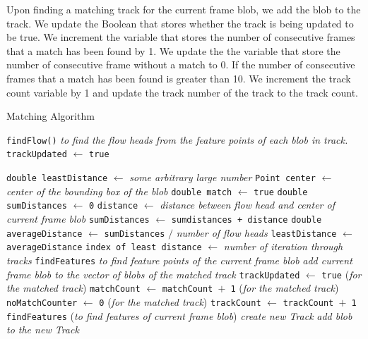 \documentclass[a4paper]{aitthesis}
\begin{document}
Upon finding a matching track for the current frame blob, we add the blob to the track. We update the Boolean that stores whether the track is being updated to be true. We increment the variable that stores the number of consecutive frames that a match has been found by 1. We update the the variable that store the number of consecutive frame without a match to 0.
If the number of consecutive frames that a match has been found is greater than 10. We increment the track count variable by 1 and update the track number of the track to the track count.
\begin{algorithm}[H]
\caption{Matching Algorithm}
\begin{algorithmic}
 
\small {}
\small \STATE \texttt{findFlow()} \textit{to find the flow heads from the feature points of each blob in track.}
\small \STATE  \texttt{trackUpdated} $\leftarrow$ \texttt{true}
\small \ENDFOR

\small {}
\small \STATE \texttt{double leastDistance} $\leftarrow$ \textit{some arbitrary large number}
\small \STATE \texttt{Point center} $\leftarrow$ \textit{center of the bounding box of the blob}
\small {}
\small \STATE \texttt{double match} $\leftarrow$ \texttt{true}
\small \STATE \texttt{double sumDistances} $\leftarrow$ \texttt{0}
\small {}
\small \STATE \texttt{distance} $\leftarrow$ \textit{distance between flow head and center of current frame blob}
\small \STATE \texttt{sumDistances} $\leftarrow$ \texttt{sumdistances + distance}
\small \ENDFOR
\small \STATE \texttt{double averageDistance} $\leftarrow$ \texttt{sumDistances} $/$ \textit{number of flow heads} 
\small {}
\small \STATE \texttt{leastDistance} $\leftarrow$ \texttt{averageDistance}
\small \STATE \texttt{index of least distance} $\leftarrow$ \textit{number of iteration through tracks}
\small \ENDIF
\small \ENDFOR
\small {}
\small \STATE \texttt{findFeatures} \textit{to find feature points of the current frame blob}
\small \STATE \textit{add current frame blob to the vector of blobs of the matched track}
\small \STATE \texttt{trackUpdated} $\leftarrow$ \texttt{true} (\textit{for the matched track})
\small \STATE \texttt{matchCount} $\leftarrow$ \texttt{matchCount $+$ 1} (\textit{for the matched track})
\small \STATE \texttt{noMatchCounter} $\leftarrow$ \texttt{0} (\textit{for the matched track})
\small {}
\small \STATE \texttt{trackCount} $\leftarrow$ \texttt{trackCount $+$ 1}
\small \ENDIF
\small \ELSE
\small \STATE \texttt{findFeatures} (\textit{to find features of current frame blob})
\small \STATE \textit{create new Track}
\small \STATE \textit{add blob to the new Track}
\small \ENDIF
\small \ENDFOR
\end{algorithmic}
\end{algorithm}
\end{document}
